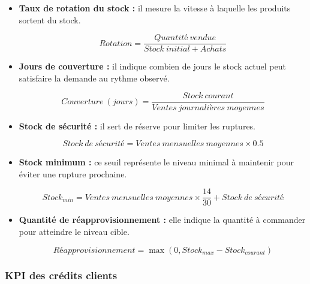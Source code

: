 \documentclass[a4paper,12pt]{report}
\begin{document}
\begin{itemize}
    \item \textbf{Taux de rotation du stock :} il mesure la vitesse à laquelle
    les produits sortent du stock.

    \[
        Rotation = \frac{Quantité\ vendue}{Stock\ initial + Achats}
    \]

    \item \textbf{Jours de couverture :} il indique combien de jours le stock
    actuel peut satisfaire la demande au rythme observé.

    \[
        Couverture\ (jours) = \frac{Stock\ courant}{Ventes\ journalières\ moyennes}
    \]

    \item \textbf{Stock de sécurité :} il sert de réserve pour limiter les
    ruptures.

    \[
        Stock\ de\ sécurité = Ventes\ mensuelles\ moyennes \times 0.5
    \]

    \item \textbf{Stock minimum :} ce seuil représente le niveau minimal à
    maintenir pour éviter une rupture prochaine.

    \[
        Stock_{min} = Ventes\ mensuelles\ moyennes \times \frac{14}{30} + Stock\ de\ sécurité
    \]

    \item \textbf{Quantité de réapprovisionnement :} elle indique la quantité à
    commander pour atteindre le niveau cible.

    \[
        Réapprovisionnement = \max(0, Stock_{max} - Stock_{courant})
    \]
\end{itemize}

\subsubsection{KPI des crédits clients}
\end{document}
